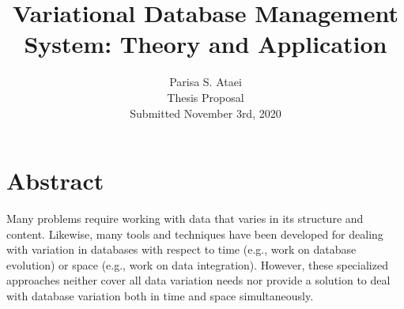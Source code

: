\documentclass[11pt]{article}
\begin{document}
\title{Variational Database Management System: Theory and Application}

\author{Parisa S. Ataei\\
Thesis Proposal \\
Submitted November 3rd, 2020
}
\date{}

\maketitle

\section*{Abstract}
Many problems require working with data that varies in its structure and content. Likewise, many tools and techniques have been developed for dealing with variation in databases with respect to time (e.g., work on database evolution) or space (e.g., work on data integration).
However, these specialized approaches neither cover all data variation needs nor provide a solution to deal with database variation both in time and space simultaneously.
\end{document}
